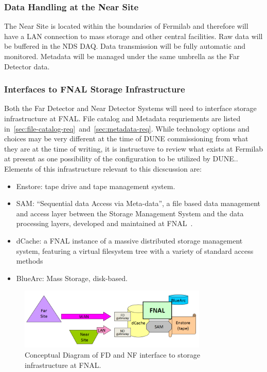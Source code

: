 \subsubsection{Data Handling at the Near Site}

The Near Site is located within the boundaries of Fermilab and therefore will have a LAN connection to mass storage
and other central facilities. Raw data will be buffered in the NDS DAQ. Data transmission will be fully automatic and monitored.
Metadata will be managed under the same umbrella as the Far Detector data.

\subsubsection{Interfaces to FNAL Storage Infrastructure}
Both the Far Detector and Near Detector Systems will need to interface storage infrastructure at FNAL.
File catalog and Metadata requriements are listed in~\ref{sec:file-catalog-req}~and~\ref{sec:metadata-req}.
While technology options and choices may be very different at the time of DUNE commissioning from what they
are at the time of writing, it is instructuve to review what exists at Fermilab at present as one possibility of the
configuration to be utilized by DUNE..
Elements of this infrastructure relevant to this dicscussion are:
\begin{itemize}
\item Enstore: tape drive and tape management system.

\item SAM: ``Sequential data Access via Meta-data'', a file based data management and access layer between the Storage Management System
and the data processing layers, developed and maintained at FNAL~\cite{sam_chep12}.

\item dCache: a FNAL instance of a massive distributed storage management system, featuring a virtual filesystem tree with a variety of standard access methods
~\cite{dcache_chep12}

\item BlueArc: Mass Storage, disk-based.

\end{itemize}

\begin{figure}[h!]
\centering
\includegraphics[width=0.8\textwidth]{fnal-data-infrastructure-sketch-1.png}
\caption{Conceptual Diagram of FD and NF interface to storage infrastructure at FNAL.}
\label{fig:fnal-data-infrastructure}
\end{figure}

